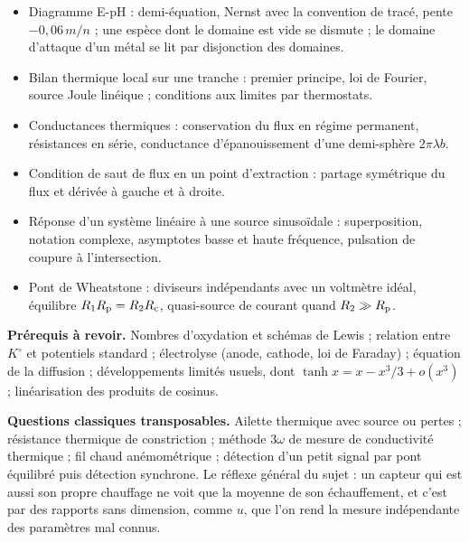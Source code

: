 \documentclass[11pt,a4paper]{article}
\providecommand{\tightlist}{\setlength{\itemsep}{0pt}\setlength{\parskip}{0pt}}
\begin{document}
\begin{itemize}
\tightlist
\item
  Diagramme E-pH : demi-équation, Nernst avec la convention de tracé, pente \(-0{,}06\,m/n\) ; une espèce dont le domaine est vide se dismute ; le domaine d'attaque d'un métal se lit par disjonction des domaines.
\item
  Bilan thermique local sur une tranche : premier principe, loi de Fourier, source Joule linéique ; conditions aux limites par thermostats.
\item
  Conductances thermiques : conservation du flux en régime permanent, résistances en série, conductance d'épanouissement d'une demi-sphère \(2\pi\lambda b\).
\item
  Condition de saut de flux en un point d'extraction : partage symétrique du flux et dérivée à gauche et à droite.
\item
  Réponse d'un système linéaire à une source sinusoïdale : superposition, notation complexe, asymptotes basse et haute fréquence, pulsation de coupure à l'intersection.
\item
  Pont de Wheatstone : diviseurs indépendants avec un voltmètre idéal, équilibre \(R_1R_{\rm p}=R_2R_{\rm c}\), quasi-source de courant quand \(R_2\gg R_{\rm p}\).
\end{itemize}

\textbf{Prérequis à revoir.} Nombres d'oxydation et schémas de Lewis ; relation entre \(K^\circ\) et potentiels standard ; électrolyse (anode, cathode, loi de Faraday) ; équation de la diffusion ; développements limités usuels, dont \(\tanh x=x-x^3/3+o(x^3)\) ; linéarisation des produits de cosinus.

\textbf{Questions classiques transposables.} Ailette thermique avec source ou pertes ; résistance thermique de constriction ; méthode \(3\omega\) de mesure de conductivité thermique ; fil chaud anémométrique ; détection d'un petit signal par pont équilibré puis détection synchrone. Le réflexe général du sujet : un capteur qui est aussi son propre chauffage ne voit que la moyenne de son échauffement, et c'est par des rapports sans dimension, comme \(u\), que l'on rend la mesure indépendante des paramètres mal connus.
\end{document}

